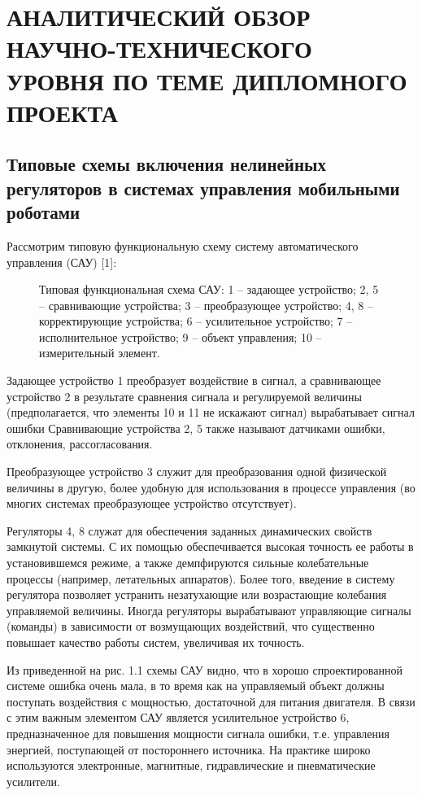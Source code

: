 \section{АНАЛИТИЧЕСКИЙ ОБЗОР НАУЧНО-ТЕХНИЧЕСКОГО УРОВНЯ ПО ТЕМЕ ДИПЛОМНОГО ПРОЕКТА}
\label{sec:domain}

\subsection{Типовые схемы включения нелинейных регуляторов в системах управления мобильными роботами}
\label{sub:domain:1}
Рассмотрим типовую функциональную схему систему автоматического управления (САУ) [1]:

\begin{figure}[ht]
\centering
  \caption{ Типовая функциональная схема САУ:
  1 – задающее устройство; 2, 5 – сравнивающие устройства; 3 – преобразующее устройство; 4, 8 – корректирующие устройства; 6 – усилительное устройство; 7 – исполнительное устройство; 9 – объект управления; 10 – измерительный элемент.}
  \label{fig:domain:1:1}
\end{figure}

Задающее устройство 1 преобразует воздействие в сигнал, а сравнивающее устройство 2 в результате сравнения сигнала и регулируемой величины (предполагается, что элементы 10 и 11 не искажают сигнал) вырабатывает сигнал ошибки Сравнивающие устройства 2, 5 также называют датчиками ошибки, отклонения, рассогласования.

Преобразующее устройство 3 служит для преобразования одной физической величины в другую, более удобную для использования в процессе управления (во многих системах преобразующее устройство отсутствует).

Регуляторы 4, 8 служат для обеспечения заданных динамических свойств замкнутой системы. С их помощью обеспечивается высокая точность ее работы в установившемся режиме, а также демпфируются сильные колебательные процессы (например, летательных аппаратов). Более того, введение в систему регулятора позволяет устранить незатухающие или возрастающие колебания управляемой величины. Иногда регуляторы вырабатывают управляющие сигналы (команды) в зависимости от возмущающих воздействий, что существенно повышает качество работы систем, увеличивая их точность.

Из приведенной на рис. 1.1 схемы САУ видно, что в хорошо спроектированной системе ошибка очень мала, в то время как на управляемый объект должны поступать воздействия с мощностью, достаточной для питания двигателя. В связи с этим важным элементом САУ является усилительное устройство 6, предназначенное для повышения мощности сигнала ошибки, т.е. управления энергией, поступающей от постороннего источника. На практике широко используются электронные, магнитные, гидравлические и пневматические усилители.


